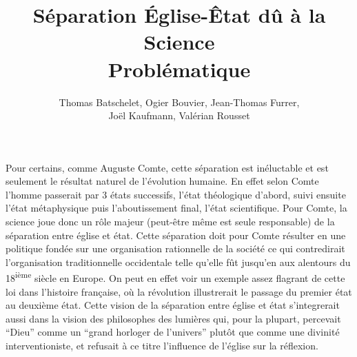 \documentclass{article}
\title{Séparation Église-Êtat dû à la Science \\
  \large{Problématique}}
\author{Thomas Batschelet, Ogier Bouvier, Jean-Thomas Furrer, \\ Joël Kaufmann, Valérian Rousset}
\begin{document}
\maketitle

Pour certains, comme Auguste Comte, cette séparation est inéluctable
et est seulement le résultat naturel de l'évolution humaine. En effet
selon Comte l'homme passerait par 3 états successifs, l'état
théologique d'abord, suivi ensuite l'état métaphysique puis
l'aboutissement final, l'état scientifique. Pour Comte, la science
joue donc un rôle majeur (peut-être même est seule responsable) de la
séparation entre église et état. Cette séparation doit pour Comte
résulter en une politique fondée sur une organisation rationnelle de
la société ce qui contredirait l'organisation traditionnelle
occidentale telle qu'elle fût jusqu'en aux alentours du
18\textsuperscript{ième} siècle en Europe. On peut en effet voir un
exemple assez flagrant de cette loi dans l'histoire française, où la
révolution illustrerait le passage du premier état au deuxième
état. Cette vision de la séparation entre église et état s'integrerait
aussi dans la vision des philosophes des lumières qui, pour la
plupart, percevait ``Dieu'' comme un ``grand horloger de l'univers''
plutôt que comme une divinité interventioniste, et refusait à ce titre
l'influence de l'église sur la réflexion.
\end{document}

